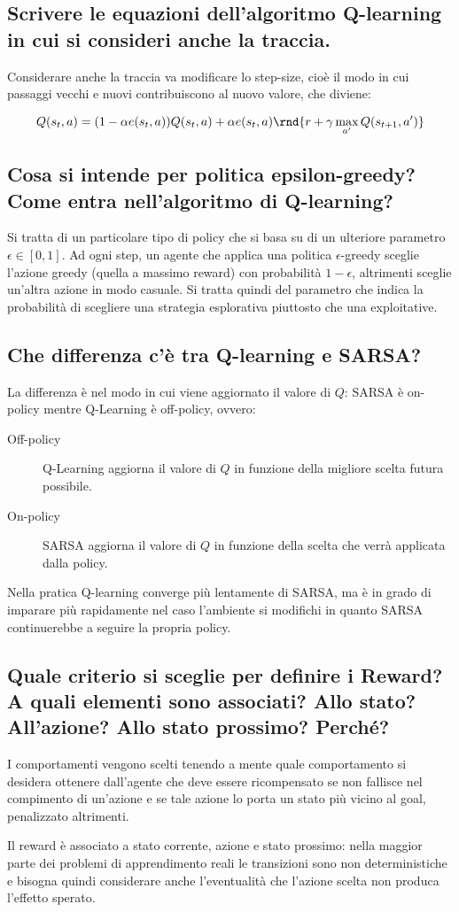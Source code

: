 \documentclass[\main/main.tex]{subfiles}
\begin{document}
\subsection{Scrivere le equazioni dell'algoritmo Q-learning in cui si consideri anche la traccia.}
Considerare anche la traccia va modificare lo step-size, cioè il modo in cui passaggi vecchi e nuovi contribuiscono al nuovo valore, che diviene:

\[
  Q(s_t,a) = (1-\alpha e(s_t,a))Q(s_t,a) + \alpha e(s_t,a)\rnd{r+\gamma\max_{a'}Q(s_{t+1},a')}
\]

\subsection{Cosa si intende per politica epsilon-greedy? Come entra nell'algoritmo di Q-learning? }
Si tratta di un particolare tipo di policy che si basa su di un ulteriore parametro $\epsilon \in [0,1]$. Ad ogni step, un agente che applica una politica $\epsilon$-greedy sceglie l'azione greedy (quella a massimo reward) con probabilità $1-\epsilon$, altrimenti sceglie un'altra azione in modo casuale. Si tratta quindi del parametro che indica la probabilità di scegliere una strategia esplorativa piuttosto che una exploitative.

\subsection{Che differenza c'è tra Q-learning e SARSA?}
La differenza è nel modo in cui viene aggiornato il valore di $Q$: SARSA è on-policy mentre Q-Learning è off-policy, ovvero:
\begin{description}
  \item[Off-policy] Q-Learning aggiorna il valore di $Q$ in funzione della migliore scelta futura possibile.
  \item[On-policy] SARSA aggiorna il valore di $Q$ in funzione della scelta che verrà applicata dalla policy.
\end{description}
Nella pratica Q-­learning converge più lentamente di SARSA, ma è in grado di imparare più rapidamente nel caso l'ambiente si modifichi in quanto SARSA continuerebbe a seguire la propria policy.

\subsection{Quale criterio si sceglie per definire i Reward? A quali elementi sono associati? Allo stato? All'azione? Allo stato prossimo? Perché?}
I comportamenti vengono scelti tenendo a mente quale comportamento si desidera ottenere dall'agente che deve essere ricompensato se non fallisce nel compimento di un'azione e se tale azione lo porta un stato più vicino al goal, penalizzato altrimenti.

Il reward è associato a stato corrente, azione e stato prossimo: nella maggior parte dei problemi di apprendimento reali le transizioni sono non deterministiche e bisogna quindi considerare anche l'eventualità che l'azione scelta non produca l'effetto sperato.


\end{document}

